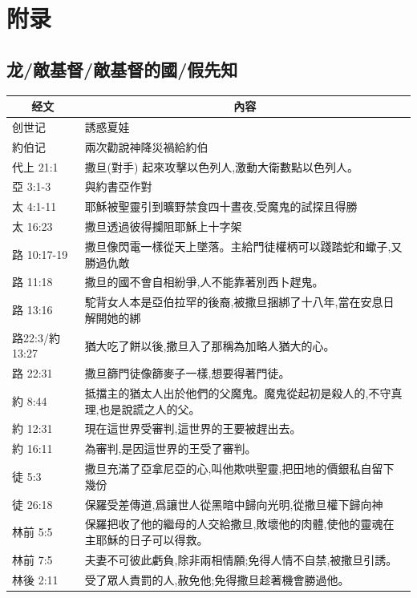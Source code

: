 \chapter{附录}

\section{龙/敵基督/敵基督的國/假先知}


\begin{table}[H]
\centering
\begin{tabular}{p{2.5cm}|p{14.0cm}}\hline\hline
\multicolumn{1}{c|}{经文}&\multicolumn{1}{c}{內容}\\\hline
创世记&誘惑夏娃\\\hline
約伯记&兩次勸說神降災禍給約伯\\\hline
代上 21:1&撒旦(對手) 起來攻擊以色列人,激動大衛數點以色列人。\\\hline
亞 3:1-3&與約書亞作對\\\hline

太 4:1-11&耶穌被聖靈引到曠野禁食四十晝夜,受魔鬼的試探且得勝\\\hline
太 16:23&撒旦透過彼得攔阻耶穌上十字架\\\hline
路 10:17-19&撒旦像閃電一樣從天上墜落。主給門徒權柄可以踐踏蛇和蠍子,又勝過仇敵\\\hline
路 11:18&撒旦的國不會自相紛爭,人不能靠著別西卜趕鬼。\\\hline
路 13:16&駝背女人本是亞伯拉罕的後裔,被撒旦捆綁了十八年,當在安息日解開她的綁\\\hline
路22:3/約13:27&猶大吃了餅以後,撒旦入了那稱為加略人猶大的心。\\\hline
路 22:31&撒旦篩門徒像篩麥子一樣,想要得著門徒。\\\hline

約 8:44&抵擋主的猶太人出於他們的父魔鬼。魔鬼從起初是殺人的,不守真理,也是說謊之人的父。\\\hline
約 12:31&現在這世界受審判,這世界的王要被趕出去。\\\hline
約 16:11&為審判,是因這世界的王受了審判。\\\hline
徒 5:3&撒旦充滿了亞拿尼亞的心,叫他欺哄聖靈,把田地的價銀私自留下幾份\\\hline
徒 26:18&保羅受差傳道,爲讓世人從黑暗中歸向光明,從撒旦權下歸向神\\\hline
林前 5:5&保羅把收了他的繼母的人交給撒旦,敗壞他的肉體,使他的靈魂在主耶穌的日子可以得救。\\\hline
林前 7:5&夫妻不可彼此虧負,除非兩相情願;免得人情不自禁,被撒旦引誘。\\\hline
林後 2:11&受了眾人責罰的人,赦免他;免得撒旦趁著機會勝過他。\\\hline


\end{tabular}
\end{table}

